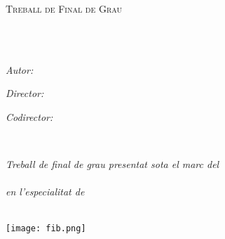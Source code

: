 \documentclass[
11pt, %
catalan, %
singlespacing, %
headsepline, %
]{MastersDoctoralThesis} %
\author{Joaquim \textsc{Motger de la Encarnación}} %
\begin{document}
\frontmatter %

\pagestyle{plain} %


\begin{titlepage}
\begin{center}

\vspace*{.06\textheight}
{\scshape\LARGE \univname\par}\vspace{1.5cm} %
\textsc{\Large Treball de Final de Grau}\\[0.5cm] %

\HRule \\[0.4cm] %
{\huge \bfseries \ttitle\par}\vspace{0.4cm} %
\HRule \\[1.5cm] %
 
\begin{minipage}[t]{0.4\textwidth}
\begin{flushleft} \large
\emph{Autor:}\\
\href{}{\authorname} %
\end{flushleft}
\end{minipage}
\begin{minipage}[t]{0.4\textwidth}
\begin{flushright} \large
\emph{Director:} \\
\href{}{\supname} %
\end{flushright}
\begin{flushright} \large
\emph{Codirector:} \\
\href{}{\examname} %
\end{flushright}
\end{minipage}\\[3cm]
 
\vfill

\large \textit{Treball de final de grau presentat sota el marc del}\\[0.3cm] %
\degreename\\[0.5cm]
\textit{en l'especialitat de}\\[0.3cm]
\groupname\\[2cm] %
 
\vfill

\texttt{[image: fib.png]} %
 
\vfill
\end{center}
\end{titlepage}
\end{document}
